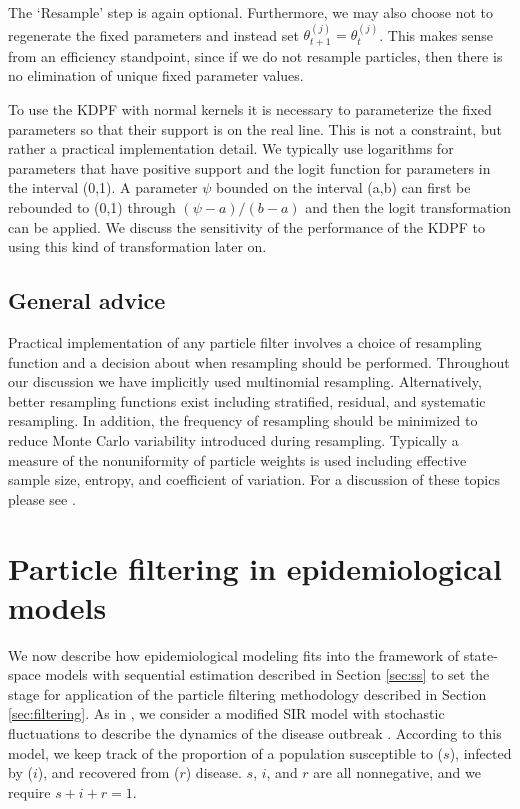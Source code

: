 \documentclass{elsarticle}
\begin{document}
\noindent The `Resample' step is again optional. Furthermore, we may also choose not to regenerate the fixed parameters and instead set $\theta_{t+1}^{(j)} = \theta_t^{(j)}$. This makes sense from an efficiency standpoint, since if we do not resample particles, then there is no elimination of unique fixed parameter values.

To use the KDPF with normal kernels it is necessary to parameterize the fixed parameters so that their support is on the real line. This is not a constraint, but rather a practical implementation detail. We typically use logarithms for parameters that have positive support and the logit function for parameters in the interval (0,1). A parameter $\psi$ bounded on the interval (a,b) can first be rebounded to (0,1) through $(\psi-a)/(b-a)$ and then the logit transformation can be applied. We discuss the sensitivity of the performance of the KDPF to using this kind of transformation later on.

\subsection{General advice \label{sec:advice}}

Practical implementation of any particle filter involves a choice of resampling function and a decision about when resampling should be performed. Throughout our discussion we have implicitly used multinomial resampling. Alternatively, better resampling functions exist including stratified, residual, and systematic resampling. In addition, the frequency of resampling should be minimized to reduce Monte Carlo variability introduced during resampling. Typically a measure of the nonuniformity of particle weights is used including effective sample size, entropy, and coefficient of variation. For a discussion of these topics please see \cite{Douc:Capp:Moul:comp:2005}.

\section{Particle filtering in epidemiological models \label{sec:apply}}

We now describe how epidemiological modeling fits into the framework of state-space models with sequential estimation described in Section \ref{sec:ss} to set the stage for application of the particle filtering methodology described in Section \ref{sec:filtering}. As in \citet{skvortsov2012monitoring}, we consider a modified SIR model with stochastic fluctuations to describe the dynamics of the disease outbreak \citep{herwaarden1995stochepid, dangerfield2009stochepid, anderson2004sars}. According to this model, we keep track of the proportion of a population susceptible to ($s$), infected by ($i$), and recovered from ($r$) disease. $s$, $i$, and $r$ are all nonnegative, and we require $s + i + r = 1$.
\end{document}
